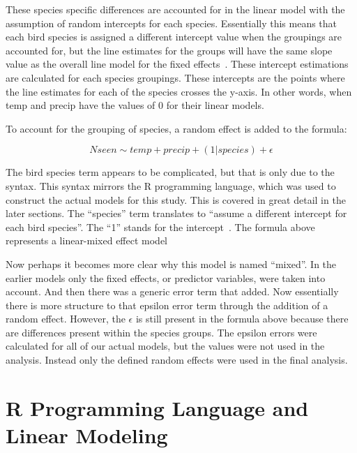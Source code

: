 These species specific differences are accounted for in the linear model with the assumption of random intercepts for each species. Essentially this means that each bird species is assigned a different intercept value when the groupings are accounted for, but the line estimates for the groups will have the same slope value as the overall line model for the fixed effects~\cite{RandomInt:online}. These intercept estimations are calculated for each species groupings. These intercepts are the points where the line estimates for each of the species crosses the y-axis. In other words, when temp and precip have the values of 0 for their linear models.

To account for the grouping of species, a random effect is added to the formula:

\[ Nseen \sim temp + precip + (1|species) + \epsilon\]

The bird species term appears to be complicated, but that is only due to the syntax. This syntax mirrors the R programming language, which was used to construct the actual models for this study. This is covered in great detail in the later sections. The ``species'' term translates to ``assume a different intercept for each bird species''. The ``1'' stands for the intercept~\cite{RMixedEffect:online}. The formula above represents a linear-mixed effect model 

Now perhaps it becomes more clear why this model is named ``mixed''. In the earlier models only the fixed effects, or predictor variables, were taken into account. And then there was a generic error term that added. Now essentially there is more structure to that epsilon error term through the addition of a random effect. However, the $\epsilon$ is still present in the formula above because there are differences present within the species groups. The epsilon errors were calculated for all of our actual models, but the values were not used in the analysis. Instead only the defined random effects were used in the final analysis.

\section{R Programming Language and Linear Modeling}



